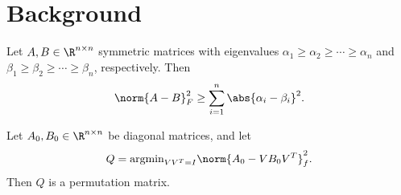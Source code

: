 \documentclass[12pt]{article}
\newcommand{\ga}[0]{\alpha}
\newcommand{\gb}[0]{\beta}
\begin{document}
\section{Background}
\begin{theorem}\label{throwawaylabel}
  Let $A,B \in \R^{n\times n}$ symmetric matrices with eigenvalues $\ga_1\geq \ga_2\geq \cdots \geq \ga_n$ and $\gb_1 \geq \gb_2 \geq \cdots \geq \gb_n$, respectively. Then
  \begin{align}
    \norm{A-B}^2_F \geq \sum_{i=1}^n \abs{\ga_i - \gb_i}^2.
  \end{align}
\end{theorem}
\begin{lemma}
  Let $A_0,B_0\in\R^{n\times n}$ be diagonal matrices, and let
  \begin{align}
    Q = \text{argmin}_{VV^T=I}\norm{A_0 - VB_0V^T}^2_f.
  \end{align}
  Then $Q$ is a permutation matrix.
\end{lemma}
\end{document}

